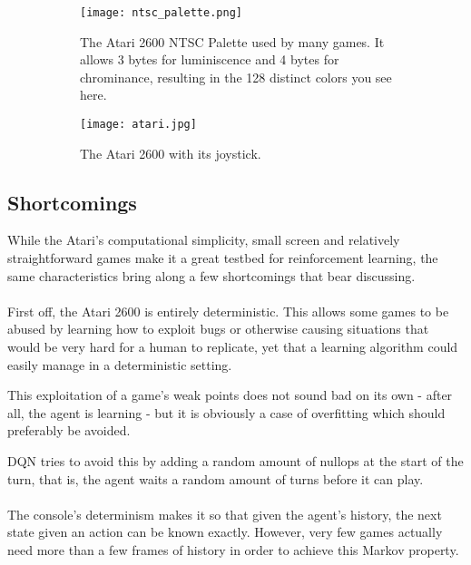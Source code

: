 \begin{figure}[h]
\center
\begin{subfigure}[t]{.5\textwidth}
  \centering
  \texttt{[image: ntsc\_palette.png]}
  \vspace{.1\baselineskip}
  \caption[NTSC Palette]{
    The Atari 2600 NTSC Palette used by many games.
    It allows 3 bytes for luminiscence
    and 4 bytes for chrominance,
    resulting in the 128 distinct colors
    you see here.
  }
  \label{fig:ntsc_palette}
\end{subfigure}
\hfill
\begin{subfigure}[t]{.4\textwidth}
  \centering
  \texttt{[image: atari.jpg]}
  \vspace{.1\baselineskip}
  \caption[Atari]{
    The Atari 2600 with its joystick.
  }
  \label{fig:atari}
\end{subfigure}
\caption[Atari]{}
\label{fig:dqn_networks}
\end{figure}

\subsection{Shortcomings}
\label{sub:shortcomings}
While the Atari's computational simplicity,
small screen
and relatively straightforward games
make it a great testbed for reinforcement learning,
the same characteristics
bring along a few shortcomings
that bear discussing.

\paragraph{}
First off, the Atari 2600
is entirely deterministic.
This allows some games to be abused
by learning how to exploit bugs
or otherwise causing situations
that would be very hard for a human to replicate,
yet that a learning algorithm could easily manage
in a deterministic setting.

This exploitation of a game's weak points
does not sound bad on its own
- after all, the agent is learning -
but it is obviously a case of overfitting
which should preferably be avoided.

DQN tries to avoid this by adding a random amount
of nullops at the start of the turn,
that is, the agent waits a random amount of turns
before it can play.

\paragraph{}
The console's determinism makes it so
that given the agent's history,
the next state given an action
can be known exactly.
However,
very few games actually need more than
a few frames of history
in order to achieve this Markov property.

